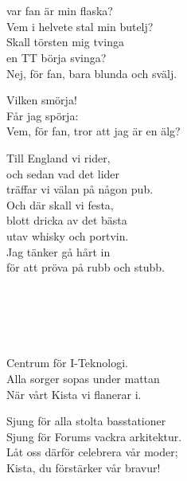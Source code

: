 

 \\       
\author{Text: Tord Andrén}

\\
var fan är min flaska?\\
Vem i helvete stal min butelj?\\
Skall törsten mig tvinga\\
en TT börja svinga?\\
Nej, för fan, bara blunda och svälj.

Vilken smörja!\\
Får jag spörja:\\
Vem, för fan, tror att jag är en älg?

Till England vi rider,\\
och sedan vad det lider\\
träffar vi välan på någon pub.\\
Och där skall vi festa,\\
blott dricka av det bästa\\
utav whisky och portvin.\\
Jag tänker gå hårt in\\
för att pröva på rubb och stubb.

 \\

\newpage 


 \\       
\author{Text: David Larsson}

\\
Centrum för I-Teknologi.\\
Alla sorger sopas under mattan\\
När vårt Kista vi flanerar i.

Sjung för alla stolta basstationer\\
Sjung för Forums vackra arkitektur.\\
Låt oss därför celebrera vår moder;\\
Kista, du förstärker vår bravur!

\\

